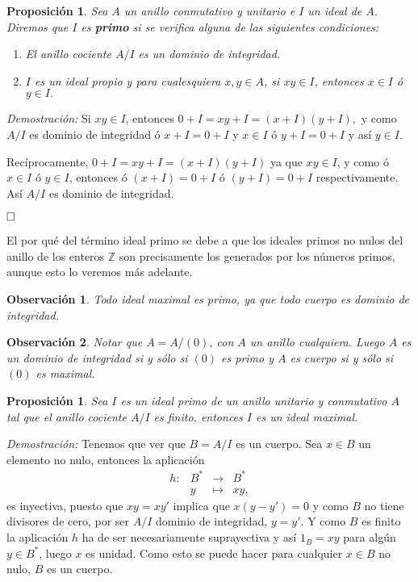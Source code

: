 \documentclass[12pt]{article}
\newtheorem{proposition}[theorem]{Proposición}
\newtheorem{observation}{Observación}[theorem]
\begin{document}
\begin{proposition} Sea $A$ un anillo conmutativo y unitario e $I$ un ideal de $A$. Diremos que $I$ es \textbf{primo} si se verifica alguna de las siguientes condiciones: \begin{enumerate}
\item El anillo cociente $A/I$ es un dominio de integridad.
\item $I$ es un ideal propio y para cualesquiera $x, y \in A$, si $xy \in I$, entonces $x \in I$ ó $y \in I.$
\end{enumerate}
\end{proposition}
\emph{Demostración: } Si $xy \in I$, entonces $0 + I = xy + I = (x + I)(y + I),$ y como $A/I$ es dominio de integridad ó $x + I = 0 + I$ y $x \in I$ ó $y + I = 0 + I$ y así $y \in I$.

Recíprocamente, $0 + I = xy + I = (x+ I)( y + I)$ ya que $xy \in I$, y como ó $x \in I$ ó $y \in I$, entonces ó $(x + I)=  0 + I$ ó $(y + I) = 0 + I$ respectivamente. Así $A/I$ es dominio de integridad.

$\hfill \square$

El por qué del término ideal primo se debe a que los ideales primos no nulos del anillo de los enteros $\mathbb{Z}$ son precisamente los generados por los números primos, aunque esto lo veremos más adelante.

\begin{observation} Todo ideal maximal es primo, ya que todo cuerpo es dominio de integridad.
\end{observation}

\begin{observation} Notar que $A = A/(0)$, con $A$ un anillo cualquiera. Luego $A$ es un dominio de integridad si y sólo si $(0)$ es primo y $A$ es cuerpo si y sólo si $(0)$ es maximal.
\end{observation}

\begin{proposition} Sea $I$ es un ideal primo de un anillo unitario y conmutativo $A$ tal que el anillo cociente $A/I$ es finito, entonces $I$ es un ideal maximal.
\end{proposition}
\emph{Demostración: } Tenemos que ver que $ B = A/I$ es un cuerpo. Sea $x \in B$ un elemento no nulo, entonces la aplicación $$\begin{array}{rccl}
h \colon &B^{\ast}&\longrightarrow &B^{\ast} \\
&y& \longmapsto &xy,
\end{array}
$$ es inyectiva, puesto que $xy = xy'$ implica que $x(y-y') =0$ y como $B$ no tiene divisores de cero, por ser $A/I$ dominio de integridad, $y = y'$. Y como $B$ es finito la aplicación $h$ ha de ser necesariamente suprayectiva y así $1_{B} = xy$ para algún $y \in B^{\ast}$, luego $x$ es unidad. Como esto se puede hacer para cualquier $x \in B$ no nulo, $B$ es un cuerpo.
\end{document}
